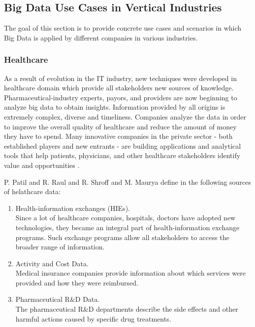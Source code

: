\documentclass[runningheads]{llncs}
\begin{document}
\subsection{Big Data Use Cases in Vertical Industries}
The goal of this section is to provide concrete use cases and scenarios in which Big Data is applied by different companies in various industries.

\subsubsection{Healthcare}

As a result of evolution in the IT industry, new techniques were developed in healthcare domain which provide all stakeholders new sources of knowledge. Pharmaceutical-industry experts, payors, and providers are now beginning to analyze big data to obtain insights. Information provided by all origins is extremely complex, diverse and timeliness. Companies analyze the data in order to improve the overall quality of healthcare and reduce the amount of money they have to spend. Many innovative companies in the private sector - both established players and new entrants - are building applications and analytical tools that help patients, physicians, and other healthcare
stakeholders identify value and opportunities \cite{USHEALTH}. 

P. Patil and R. Raul and R. Shroff and M. Maurya define in \cite{HEALTHARTICLE} the following sources of helathcare data:

\begin{enumerate}

\item Health-information exchanges (HIEs).\\

Since a lot of healthcare companies, hospitals, doctors have adopted new technologies, they became an integral part of health-information exchange programs. Such exchange programs allow all stakeholders to access the broader range of information.\\

\item Activity and Cost Data.\\

Medical insurance companies provide information about which services were provided and how they were reimbursed.\\

\item Pharmaceutical R\&D Data.\\

The pharmaceutical R\&D departments describe the side effects and other harmful actions caused by specific drug treatments.\\
\end{enumerate}
\end{document}
